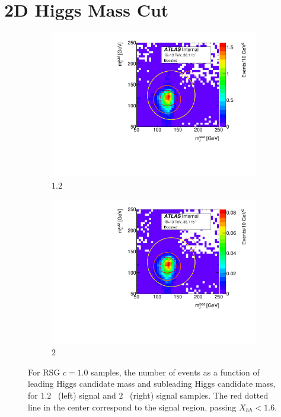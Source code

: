 \section{2D Higgs Mass Cut}
\begin{figure}[htbp!]
\centering
\captionsetup{justification=centering}
    \hspace{-2cm}
    \begin{subfigure}[b]{0.4\textwidth}
        \includegraphics[width=\textwidth,angle=-90]{figures/boosted/Truth/Sig_1200_AllTag_Incl_mH0H1.pdf}
        \caption{$1.2$\TeV~ \Grav}
        \label{fig:evt-signal-mhh_1200}
    \end{subfigure}
    \quad \quad \quad \quad
    \begin{subfigure}[b]{0.4\textwidth}
        \includegraphics[width=\textwidth,angle=-90]{figures/boosted/Truth/Sig_2000_AllTag_Incl_mH0H1.pdf}
        \caption{$2$\TeV~ \Grav}
        \label{fig:evt-signal-mhh_2000}
    \end{subfigure}
\caption{For RSG $c=1.0$ samples, the number of events as a function of leading Higgs candidate mass and subleading Higgs candidate mass, for $1.2$ \TeV~(left) signal and $2$ \TeV~(right) signal samples. The red dotted line in the center correspond to the signal region, passing $X_{hh} < 1.6$.}
\label{fig:evt-signal-mhh}
\end{figure}

